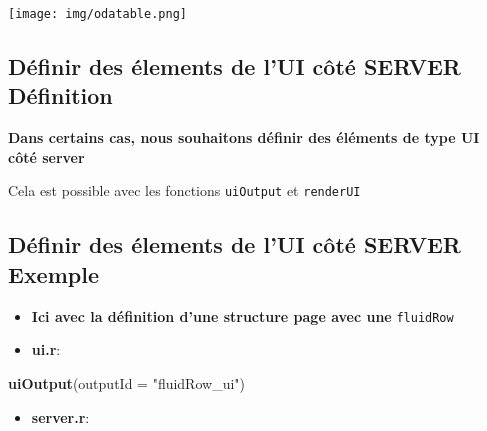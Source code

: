 \documentclass[
]{article}
\newenvironment{Shaded}{\begin{snugshade}}{\end{snugshade}}
\newcommand{\AttributeTok}[1]{\textcolor[rgb]{0.13,0.29,0.53}{#1}}
\newcommand{\DecValTok}[1]{\textcolor[rgb]{0.00,0.00,0.81}{#1}}
\newcommand{\FunctionTok}[1]{\textcolor[rgb]{0.13,0.29,0.53}{\textbf{#1}}}
\newcommand{\NormalTok}[1]{#1}
\newcommand{\OtherTok}[1]{\textcolor[rgb]{0.56,0.35,0.01}{#1}}
\newcommand{\SpecialCharTok}[1]{\textcolor[rgb]{0.81,0.36,0.00}{\textbf{#1}}}
\newcommand{\StringTok}[1]{\textcolor[rgb]{0.31,0.60,0.02}{#1}}
\providecommand{\tightlist}{%
  \setlength{\itemsep}{0pt}\setlength{\parskip}{0pt}}
\begin{document}
\begin{Shaded}
\end{Shaded}

\texttt{[image: img/odatable.png]}

\hypertarget{duxe9finir-des-uxe9lements-de-lui-cuxf4tuxe9-server-duxe9finition}{%
\subsection{Définir des élements de l'UI côté SERVER \textbar{}
Définition}\label{duxe9finir-des-uxe9lements-de-lui-cuxf4tuxe9-server-duxe9finition}}

\textbf{Dans certains cas, nous souhaitons définir des éléments de type
UI côté server}

Cela est possible avec les fonctions \texttt{uiOutput} et
\texttt{renderUI}

\hypertarget{duxe9finir-des-uxe9lements-de-lui-cuxf4tuxe9-server-exemple}{%
\subsection{Définir des élements de l'UI côté SERVER \textbar{}
Exemple}\label{duxe9finir-des-uxe9lements-de-lui-cuxf4tuxe9-server-exemple}}

\begin{itemize}
\item
  \textbf{Ici avec la définition d'une structure page avec une}
  \texttt{fluidRow}
\item
  \textbf{ui.r}:
\end{itemize}

\begin{Shaded}
\begin{Highlighting}[]
\FunctionTok{uiOutput}\NormalTok{(}\AttributeTok{outputId =} \StringTok{"fluidRow\_ui"}\NormalTok{)}
\end{Highlighting}
\end{Shaded}

\begin{itemize}
\tightlist
\item
  \textbf{server.r}:
\end{itemize}

\begin{Shaded}
\end{Shaded}
\end{document}
